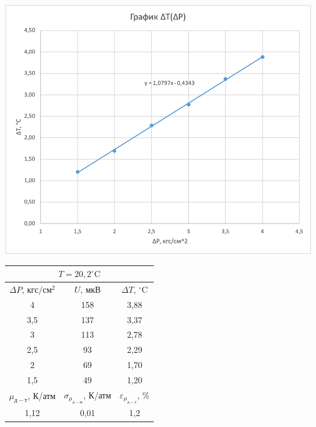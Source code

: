 \documentclass[a4paper, 12pt]{article}
\begin{document}
    \begin{table}[pt]

        \begin{minipage}[ht]{0.55\linewidth}
            \includegraphics[width=\linewidth]{images/ch1.png}
        \end{minipage}
        \hfill
        \begin{minipage}[ht]{0.47\linewidth}
            \begin{tabular}{|c|c|c|}
                \hline
                \multicolumn{3}{|c|}{$T = 20,2^{\circ}\text{C}$} \\
                \hline
                $\Delta P$, $кгс/см^2$ & $U$, $мкВ$ & $\Delta T$, $^{\circ}\text{C}$ \\
                \hline
                4 & 158 & 3,88 \\
                \hline
                3,5 & 137 & 3,37 \\
                \hline
                3 & 113 & 2,78 \\
                \hline
                2,5 & 93 & 2,29 \\
                \hline
                2 & 69 & 1,70 \\
                \hline
                1,5 & 49 & 1,20 \\
                \hline
                $\mu_{д-т}$, К/атм & $\sigma_{\mu_{д-м}}$, К/атм & $\varepsilon_{\mu_{д-т}}$, \% \\
                \hline
                1,12 & 0,01 & 1,2 \\
                \hline
            \end{tabular}
        \end{minipage}
        

\end{table}
\end{document}
